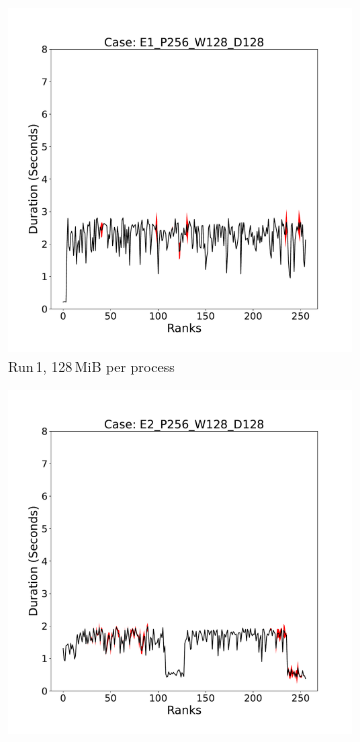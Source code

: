 \begin{figure}[h!]
     \centering
     \begin{subfigure}[b]{0.3\textwidth}
         \centering
         \includegraphics[width=\textwidth, height=\textwidth]{figures/E1_P256_W128_D128.pdf}
         \caption{Run\,1, 128\,MiB per process}
         \label{fig:E1_128}
     \end{subfigure}
     \hfill
     \begin{subfigure}[b]{0.3\textwidth}
         \centering
         \includegraphics[width=\textwidth, height=\textwidth]{figures/E2_P256_W128_D128.pdf}

\end{subfigure}
\end{figure}
